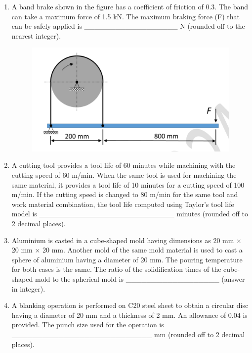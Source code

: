 \documentclass[journal,11pt,onecolumn]{IEEEtran}
\begin{document}
\begin{enumerate}[resume]
    \item A band brake shown in the figure has a coefficient of friction of 0.3. The band can take a maximum force of 1.5 kN. The maximum braking force (F) that can be safely applied is \_\_\_\_\_\_\_\_\_\_\_\_\_\_\_\_\_\_ N (rounded off to the nearest integer).

          \begin{figure}[H]
              \centering
              \includegraphics[scale=0.2]{q59}
              \caption{}
              \label{fig:q59}
          \end{figure}

    \item A cutting tool provides a tool life of 60 minutes while machining with the cutting speed of 60 m/min. When the same tool is used for machining the same material, it provides a tool life of 10 minutes for a cutting speed of 100 m/min. If the cutting speed is changed to 80 m/min for the same tool and work material combination, the tool life computed using Taylor's tool life model is \_\_\_\_\_\_\_\_\_\_\_\_\_\_\_\_\_\_\_\_\_\_\_\_\_\_ minutes (rounded off to 2 decimal places).

    \item Aluminium is casted in a cube-shaped mold having dimensions as 20 mm × 20 mm × 20 mm. Another mold of the same mold material is used to cast a sphere of aluminium having a diameter of 20 mm. The pouring temperature for both cases is the same. The ratio of the solidification times of the cube-shaped mold to the spherical mold is \_\_\_\_\_\_\_\_\_\_\_\_\_\_\_\_\_\_ (answer in integer).

    \item A blanking operation is performed on C20 steel sheet to obtain a circular disc having a diameter of 20 mm and a thickness of 2 mm. An allowance of 0.04 is provided. The punch size used for the operation is \_\_\_\_\_\_\_\_\_\_\_\_\_\_\_\_\_\_\_\_\_\_\_\_\_\_\_ mm (rounded off to 2 decimal places).


\end{enumerate}
\end{document}
